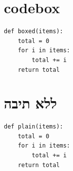

\section{codebox}

\begin{codebox}
\begin{asmblock}
\begin{lstlisting}[style=pystyle]
def boxed(items):
    total = 0
    for i in items:
        total += i
    return total
\end{lstlisting}
\end{asmblock}
\end{codebox}

\clearpage
\section{ללא תיבה}

\begin{asmblock}
\begin{lstlisting}[style=pystyle]
def plain(items):
    total = 0
    for i in items:
        total += i
    return total
\end{lstlisting}
\end{asmblock}


